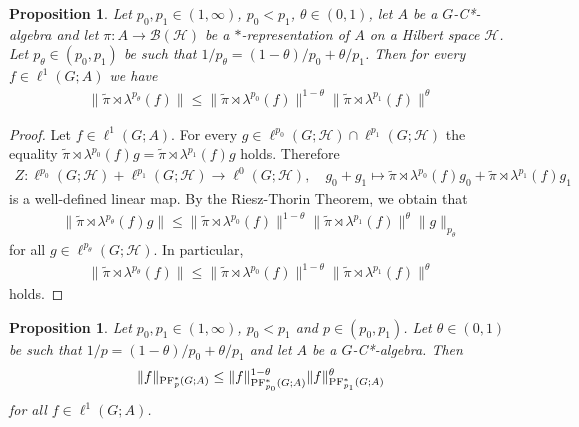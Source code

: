 \documentclass[12pt]{amsart}
\newtheorem{prop}[thm]{Proposition}
\theoremstyle{definition}
\theoremstyle{remark}
\numberwithin{equation}{section}
\begin{document}
\begin{prop}\label{CP:cov:interpolation}
	Let $p_0, p_1 \in (1,\infty)$, $p_0< p_1$, $\theta \in (0,1)$, let $A$ be a $G$-C*-algebra and let
	$\pi\colon A \to \mathcal{B}(\mathcal{H})$ be a $*$-representation of $A$ on a
	Hilbert space $\mathcal{H}$. Let
	$p_\theta \in (p_0,p_1)$ be such that $1/p_\theta = (1-\theta)/p_0 + \theta/p_1$.
	Then for every $f\in \ell^1(G;A)$ we have
	\begin{align*}
		\| \widetilde{\pi}\rtimes \lambda^{p_\theta}(f)\|
		\leq \|\widetilde{\pi} \rtimes \lambda^{p_0}(f)\|^{1-\theta}
		\| \widetilde{\pi}\rtimes \lambda^{p_1}
		(f)\|^\theta
	\end{align*}
\end{prop}
\begin{proof}
	Let $f\in \ell^1(G;A)$. For every $g\in \ell^{p_0}(G;\mathcal{H})
	\cap \ell^{p_1}(G;\mathcal{H})$ the equality
	$\widetilde{\pi}\rtimes \lambda^{p_0}(f)g
	= \widetilde{\pi}\rtimes \lambda^{p_1}(f)g$ holds. Therefore
	\begin{align*}
		Z\colon \ell^{p_0}(G;\mathcal{H})+ \ell^{p_1}(G;\mathcal{H}) \to \ell^0(G;
		\mathcal{H}),\quad g_0+g_1 \mapsto \widetilde{\pi}\rtimes \lambda^{p_0}(f)g_0
		+ \widetilde{\pi}\rtimes \lambda^{p_1}(f)g_1
	\end{align*}
	is a well-defined linear map. By the Riesz-Thorin Theorem, we obtain that
	\begin{align*}
		\|\widetilde{\pi}\rtimes \lambda^{p_\theta}(f) g\|
		\leq \| \widetilde{\pi}\rtimes \lambda^{p_0}(f)\|^{1-\theta}
		\| \widetilde{\pi}\rtimes \lambda^{p_1}(f)\|^\theta \| g\|_{{p_\theta}}
	\end{align*}
	for all $g\in \ell^{p_\theta}(G;\mathcal{H})$. In particular,
	\begin{align}
		\|\widetilde{\pi}\rtimes \lambda^{p_\theta}(f)\| \leq
		\| \widetilde{\pi}\rtimes \lambda^{p_0}(f)\|^{1-\theta} \|\widetilde{\pi}
		\rtimes \lambda^{p_1}(f)\|^\theta
	\end{align}
	holds.
\end{proof}

\begin{prop}\label{CP:cov:interpolationPseodo}
	Let $p_0, p_1 \in (1,\infty)$, $p_0 < p_1$ and $ p \in (p_0,p_1)$. Let
	$\theta \in (0,1)$ be such that $1/p = (1-\theta)/p_0 + \theta/p_1$ and let $A$ be a $G$-C*-algebra. Then
	\begin{align*}
		\|f \|_{\textup{PF}^*_p(G;A)}\leq \| f \|_{\textup{PF}^*_{p_0}(G;A)}^{1-\theta}\|f\|_{\textup{PF}_{p_1}^*(G;A)}^\theta
	\end{align*}
	for all $f\in \ell^1(G;A)$. %
\end{prop}
\end{document}
